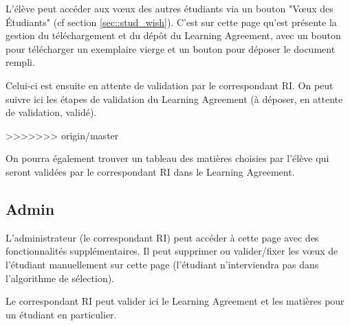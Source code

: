 L'élève peut accéder aux vœux des autres étudiants via un bouton "Vœux des Étudiants" (cf section \ref{sec::stud_wish}).
C'est sur cette page qu'est présente la gestion du téléchargement et du dépôt du Learning Agreement, avec un bouton pour télécharger un exemplaire vierge et un bouton pour déposer le document rempli.

Celui-ci est ensuite en attente de validation par le correspondant RI. On peut suivre ici les étapes de validation du Learning Agreement (à déposer, en attente de validation, validé).

>>>>>>> origin/master
\bigbreak

On pourra également trouver un tableau des matières choisies par l'élève qui seront validées par le correspondant RI dans le Learning Agreement.

\subsection{Admin}

L'administrateur (le correspondant RI) peut accéder à cette page avec des fonctionnalités supplémentaires.
Il peut supprimer ou valider/fixer les vœux de l'étudiant manuellement sur cette page (l'étudiant n'interviendra pas dans l'algorithme de sélection).

Le correspondant RI peut valider ici le Learning Agreement et les matières pour un étudiant en particulier.
